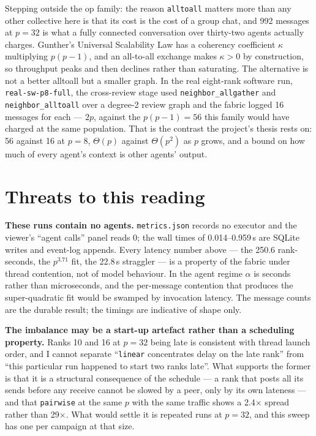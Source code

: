 \documentclass[11pt]{article}
\begin{document}
Stepping outside the op family: the reason \texttt{alltoall} matters more than any other
collective here is that its cost is the cost of a group chat, and 992 messages at $p=32$ is
what a fully connected conversation over thirty-two agents actually charges. Gunther's
Universal Scalability Law has a coherency coefficient $\kappa$ multiplying $p(p-1)$, and an
all-to-all exchange makes $\kappa > 0$ by construction, so throughput peaks and then declines
rather than saturating. The alternative is not a better alltoall but a smaller graph. In the
real eight-rank software run, \texttt{real-sw-p8-full}, the cross-review stage used
\texttt{neighbor\_allgather} and \texttt{neighbor\_alltoall} over a degree-2 review graph and
the fabric logged 16 messages for each --- $2p$, against the $p(p-1) = 56$ this family would
have charged at the same population. That is the contrast the project's thesis rests on: 56
against 16 at $p=8$, $\Theta(p)$ against $\Theta(p^2)$ as $p$ grows, and a bound on how much
of every agent's context is other agents' output.

\section{Threats to this reading}

\textbf{These runs contain no agents.} \texttt{metrics.json} records no executor and the
viewer's ``agent calls'' panel reads 0; the wall times of 0.014--0.959\,s are SQLite writes
and event-log appends. Every latency number above --- the 250.6 rank-seconds, the $p^{3.71}$
fit, the 22.8\,s straggler --- is a property of the fabric under thread contention, not of
model behaviour. In the agent regime $\alpha$ is seconds rather than microseconds, and the
per-message contention that produces the super-quadratic fit would be swamped by invocation
latency. The message counts are the durable result; the timings are indicative of shape only.

\textbf{The imbalance may be a start-up artefact rather than a scheduling property.} Ranks 10
and 16 at $p=32$ being late is consistent with thread launch order, and I cannot separate
``\texttt{linear} concentrates delay on the late rank'' from ``this particular run happened to
start two ranks late''. What supports the former is that it is a structural consequence of the
schedule --- a rank that posts all its sends before any receive cannot be slowed by a peer,
only by its own lateness --- and that \texttt{pairwise} at the same $p$ with the same traffic
shows a 2.4$\times$ spread rather than 29$\times$. What would settle it is repeated runs at
$p=32$, and this sweep has one per campaign at that size.
\end{document}
